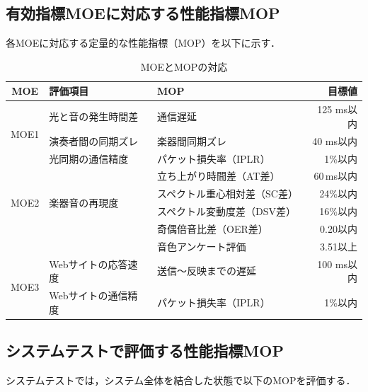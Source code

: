 \documentclass[lualatex,book,openany,paper=a4paper,jafontsize=11.5pt,jafontscale=1.05]{jlreq}
\begin{document}
\subsection{有効指標MOEに対応する性能指標MOP}

各MOEに対応する定量的な性能指標（MOP）を以下に示す．

\begin{table}[h]
\centering
\caption{MOEとMOPの対応}
\begin{tabular}{|c|l|l|r|}
\hline
MOE & 評価項目 & MOP & 目標値 \\
\hline
\multirow{3}{*}{MOE1} & 光と音の発生時間差 & 通信遅延 & 125 ms以内 \\
                       & 演奏者間の同期ズレ & 楽器間同期ズレ & 40 ms以内 \\
                       & 光同期の通信精度   & パケット損失率（IPLR） & 1\%以内 \\
\hline
\multirow{4}{*}{MOE2} & \multirow{4}{*}{楽器音の再現度} & 立ち上がり時間差（AT差） & 60\,ms以内 \\
                       &                                & スペクトル重心相対差（SC差） & 24\%以内 \\
                       &                               & スペクトル変動度差（DSV差） & 16\%以内 \\
                       &                               & 奇偶倍音比差（OER差） & 0.20以内 \\
                       &                               & 音色アンケート評価 & 3.51以上 \\

\hline
\multirow{2}{*}{MOE3} & Webサイトの応答速度 & 送信〜反映までの遅延 & 100 ms以内 \\
                       & Webサイトの通信精度 & パケット損失率（IPLR） & 1\%以内 \\
\hline
\end{tabular}
\end{table}
\subsection{システムテストで評価する性能指標MOP}
システムテストでは，システム全体を結合した状態で以下のMOPを評価する．
\end{document}
